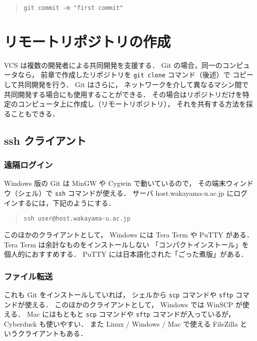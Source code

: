 \documentclass[a4j,10pt]{jarticle}
\begin{document}
\begin{quote}
\begin{verbatim}
git commit -m "first commit"
\end{verbatim}
\end{quote}

\section{リモートリポジトリの作成}
VCS は複数の開発者による共同開発を支援する．
Git の場合，同一のコンピュータなら，
前章で作成したリポジトリを \verb|git clone| コマンド（後述）で
コピーして共同開発を行う．
Git はさらに，
ネットワークを介して異なるマシン間で共同開発する場合にも使用することができる．
その場合はリポジトリだけを特定のコンピュータ上に作成し（リモートリポジトリ），
それを共有する方法を採ることもできる．

\subsection{ssh クライアント}

\subsubsection{遠隔ログイン}
Windows 版の Git は MinGW や Cygwin で動いているので，
その端末ウィンドウ（シェル）で \verb|ssh| コマンドが使える．
サーバ host.wakayama-u.ac.jp にログインするには，下記のようにする．

\begin{quote}
\begin{verbatim}
ssh user@host.wakayama-u.ac.jp
\end{verbatim}
\end{quote}

このほかのクライアントとして，
Windows には Tera Term や PuTTY がある．
Tera Term は余計なものをインストールしない
「コンパクトインストール」を個人的におすすめする．
PuTTY には日本語化された「ごった煮版」がある．

\subsubsection{ファイル転送}
これも Git をインストールしていれば，
シェルから \verb|scp| コマンドや \verb|sftp| コマンドが使える．
このほかのクライアントとして，
Windows では WinSCP が使える．
Mac にはもともと \verb|scp| コマンドや \verb|sftp| コマンドが入っているが，
Cyberduck も使いやすい．
また Linux / Windows / Mac で使える FileZilla というクライアントもある．
\end{document}

